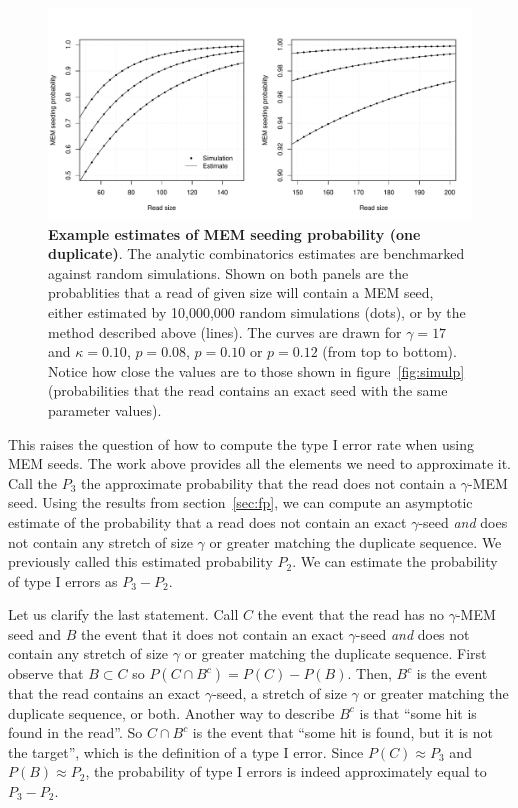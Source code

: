 \documentclass{article}
\begin{document}
\begin{figure}[h]
\centering
\includegraphics[scale=0.445]{simulp_mem.pdf}
\caption{\textbf{Example estimates of MEM seeding probability (one
duplicate)}. The analytic combinatorics estimates are benchmarked against
random simulations. Shown on both panels are the probablities that a read
of given size will contain a MEM seed, either estimated by 10,000,000
random simulations (dots), or by the method described above (lines). The
curves are drawn for $\gamma=17$ and $\kappa=0.10$, $p=0.08$, $p=0.10$ or
$p=0.12$ (from top to bottom). Notice how close the values are to those
shown in figure~\ref{fig:simulp} (probabilities that the read contains an
exact seed with the same parameter values).}
\label{fig:simulp_mem}
\end{figure}


This raises the question of how to compute the type I error rate when
using MEM seeds. The work above provides all the elements we need to
approximate it. Call the $P_3$ the approximate probability that the read
does not contain a $\gamma$-MEM seed. Using the results from
section~\ref{sec:fp}, we can compute an asymptotic estimate of the
probability that a read does not contain an exact $\gamma$-seed \emph{and}
does not contain any stretch of size $\gamma$ or greater matching the
duplicate sequence. We previously called this estimated probability $P_2$.
We can estimate the probability of type I errors as $P_3-P_2$.

Let us clarify the last statement. Call $C$ the event that the read has no
$\gamma$-MEM seed and $B$ the event that it does not contain an exact
$\gamma$-seed \emph{and} does not contain any stretch of size $\gamma$ or
greater matching the duplicate sequence. First observe that $B \subset C$
so $P(C \cap B^c) = P(C) - P(B)$. Then, $B^c$ is the event that the read
contains an exact $\gamma$-seed, a stretch of size $\gamma$ or greater
matching the duplicate sequence, or both. Another way to describe $B^c$ is
that ``some hit is found in the read''. So $C \cap B^c$ is the event that
``some hit is found, but it is not the target'', which is the definition
of a type I error. Since $P(C) \approx P_3$ and $P(B) \approx P_2$, the
probability of type I errors is indeed approximately equal to $P_3 - P_2$.
\end{document}

